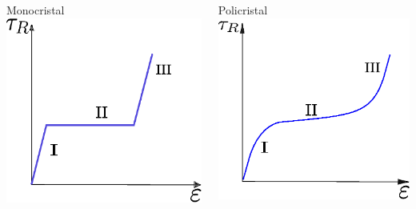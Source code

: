 \documentclass[usenames,dvipsnames]{beamer}
\begin{document}
\begin{frame}
\begin{columns}
\begin{block}{Monocristal}
\includegraphics[height=0.35\textheight]{img/intro/SigmavsDef.eps} 
\end{block}

\begin{block}{Policristal}
\includegraphics[height=0.35\textheight]{img/intro/SigmavsDefPoli.eps}
\end{block}

\end{columns}

 
\end{frame}
\end{document}
